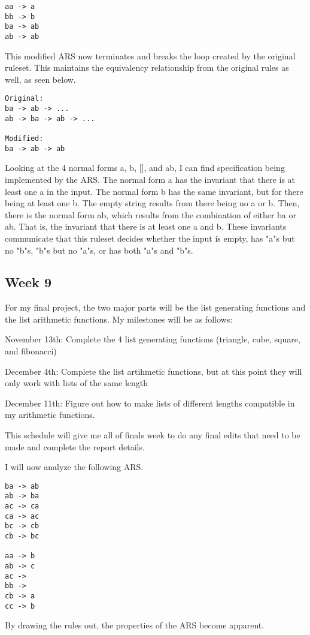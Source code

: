 \documentclass{article}
\theoremstyle{theorem}
\theoremstyle{definition}
\theoremstyle{remark}
\begin{document}
\begin{lstlisting}
aa -> a
bb -> b
ba -> ab
ab -> ab
\end{lstlisting}
%
This modified ARS now terminates and breaks the loop created by the original ruleset. This maintains the equivalency relationship from the original rules as well, as seen below.

\begin{lstlisting}
Original:
ba -> ab -> ...
ab -> ba -> ab -> ...

Modified:
ba -> ab -> ab
\end{lstlisting}
%
Looking at the 4 normal forms a, b, [], and ab, I can find specification being implemented by the ARS. The normal form a has the invariant that there is at least one a in the input. The normal form b has the same invariant, but for there being at least one b. The empty string results from there being no a or b. Then, there is the normal form ab, which results from the combination of either ba or ab. That is, the invariant that there is at least one a and b. These invariants communicate that this ruleset decides whether the input is empty, has "a"s but no "b"s, "b"s but no "a"s, or has both "a"s and "b"s.

\subsection{Week 9}
For my final project, the two major parts will be the list generating functions and the list arithmetic functions. My milestones will be as follows:

\medskip\noindent
November 13th: Complete the 4 list generating functions (triangle, cube, square, and fibonacci)

\medskip\noindent
December 4th: Complete the list artihmetic functions, but at this point they will only work with lists of the same length

\medskip\noindent
December 11th: Figure out how to make lists of different lengths compatible in my arithmetic functions.

\medskip\noindent This schedule will give me all of finals week to do any final edits that need to be made and complete the report details.

\medskip\noindent
I will now analyze the following ARS.

\begin{lstlisting}
ba -> ab
ab -> ba
ac -> ca
ca -> ac
bc -> cb
cb -> bc

aa -> b
ab -> c
ac ->  
bb ->
cb -> a
cc -> b
\end{lstlisting}
%
By drawing the rules out, the properties of the ARS become apparent.
\end{document}
